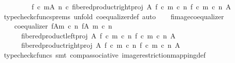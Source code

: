 \begin{isabellebody}
\ \ \ \ \ \ \ \ {\isacharequal}{\kern0pt}\ {\isacharparenleft}{\kern0pt}f\ {\isasymcirc}\isactrlsub c\ m{\isacharparenright}{\kern0pt}{\isasymrestriction}\isactrlbsub {\isacharparenleft}{\kern0pt}A{\isacharcomma}{\kern0pt}\ n{\isacharparenright}{\kern0pt}\isactrlesub \ {\isasymcirc}\isactrlsub c\ fibered{\isacharunderscore}{\kern0pt}product{\isacharunderscore}{\kern0pt}right{\isacharunderscore}{\kern0pt}proj\ A\ {\isacharparenleft}{\kern0pt}f\ {\isasymcirc}\isactrlsub c\ m\ {\isasymcirc}\isactrlsub c\ n{\isacharparenright}{\kern0pt}\ {\isacharparenleft}{\kern0pt}f\ {\isasymcirc}\isactrlsub c\ m\ {\isasymcirc}\isactrlsub c\ n{\isacharparenright}{\kern0pt}\ A{\isachardoublequoteclose}\isanewline
\ \ \ \ \isamarkupfalse%
\ {\isacharparenleft}{\kern0pt}typecheck{\isacharunderscore}{\kern0pt}cfuncs{\isacharunderscore}{\kern0pt}prems{\isacharcomma}{\kern0pt}\ unfold\ coequalizer{\isacharunderscore}{\kern0pt}def{}{\isacharcomma}{\kern0pt}\ auto{\isacharparenright}{\kern0pt}\isanewline
\isanewline
\ \ \isamarkupfalse%
\ f{\isacharunderscore}{\kern0pt}image{\isacharunderscore}{\kern0pt}coequalizer{\isacharcolon}{\kern0pt}\isanewline
\ \ \ \ {\isachardoublequoteopen}coequalizer\ {\isacharparenleft}{\kern0pt}f{\isasymlparr}A{\isasymrparr}\isactrlbsub m\ {\isasymcirc}\isactrlsub c\ n\isactrlesub {\isacharparenright}{\kern0pt}\ {\isacharparenleft}{\kern0pt}f{\isasymrestriction}\isactrlbsub {\isacharparenleft}{\kern0pt}A{\isacharcomma}{\kern0pt}\ m\ {\isasymcirc}\isactrlsub c\ n{\isacharparenright}{\kern0pt}\isactrlesub {\isacharparenright}{\kern0pt}\ \isanewline
\ \ \ \ \ \ {\isacharparenleft}{\kern0pt}fibered{\isacharunderscore}{\kern0pt}product{\isacharunderscore}{\kern0pt}left{\isacharunderscore}{\kern0pt}proj\ A\ {\isacharparenleft}{\kern0pt}f\ {\isasymcirc}\isactrlsub c\ m\ {\isasymcirc}\isactrlsub c\ n{\isacharparenright}{\kern0pt}\ {\isacharparenleft}{\kern0pt}f\ {\isasymcirc}\isactrlsub c\ m\ {\isasymcirc}\isactrlsub c\ n{\isacharparenright}{\kern0pt}\ A{\isacharparenright}{\kern0pt}\ \isanewline
\ \ \ \ \ \ {\isacharparenleft}{\kern0pt}fibered{\isacharunderscore}{\kern0pt}product{\isacharunderscore}{\kern0pt}right{\isacharunderscore}{\kern0pt}proj\ A\ {\isacharparenleft}{\kern0pt}f\ {\isasymcirc}\isactrlsub c\ m\ {\isasymcirc}\isactrlsub c\ n{\isacharparenright}{\kern0pt}\ {\isacharparenleft}{\kern0pt}f\ {\isasymcirc}\isactrlsub c\ m\ {\isasymcirc}\isactrlsub c\ n{\isacharparenright}{\kern0pt}\ A{\isacharparenright}{\kern0pt}{\isachardoublequoteclose}\isanewline
\ \ \ \ \isamarkupfalse%
\ {\isacharparenleft}{\kern0pt}typecheck{\isacharunderscore}{\kern0pt}cfuncs{\isacharcomma}{\kern0pt}\ smt\ comp{\isacharunderscore}{\kern0pt}associative{}\ image{\isacharunderscore}{\kern0pt}restriction{\isacharunderscore}{\kern0pt}mapping{\isacharunderscore}{\kern0pt}def{}{\isacharparenright}{\kern0pt}\isanewline

\end{isabellebody}
